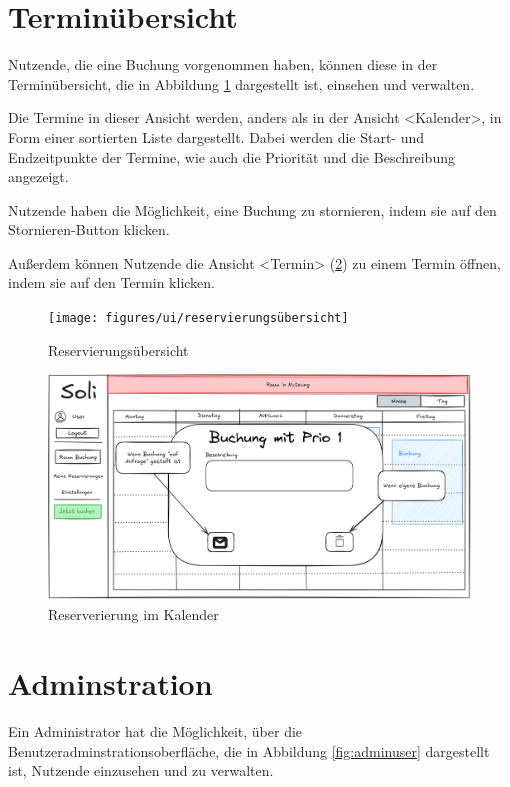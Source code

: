 \section{Terminübersicht}
Nutzende, die eine Buchung vorgenommen haben, können diese in der Terminübersicht,
die in Abbildung \ref{fig:overview} dargestellt ist, einsehen und verwalten.

Die Termine in dieser Ansicht werden, anders als in der Ansicht <Kalender>, in Form einer sortierten Liste dargestellt.
Dabei werden die Start- und Endzeitpunkte der Termine, wie auch die Priorität und die Beschreibung angezeigt.

Nutzende haben die Möglichkeit, eine Buchung zu stornieren, indem sie auf den Stornieren-Button klicken.

Außerdem können Nutzende die Ansicht <Termin> (\ref{fig:calendarviewbooking}) zu einem Termin öffnen, indem sie auf den Termin klicken.

\begin{figure}[ht]
    \texttt{[image: figures/ui/reservierungsübersicht]}
    \caption{Reservierungsübersicht}
    \label{fig:overview}
\end{figure}
\clearpage
\begin{figure}
    \centering
    \includegraphics[scale=0.15]{figures/ui/reservierunginkalendar}
    \caption{Reserverierung im Kalender}
    \label{fig:calendarviewbooking}
\end{figure}

\section{Adminstration}
Ein Administrator hat die Möglichkeit, über die Benutzeradminstrationsoberfläche,
die in Abbildung \ref{fig:adminuser} dargestellt ist, Nutzende einzusehen und zu verwalten.

